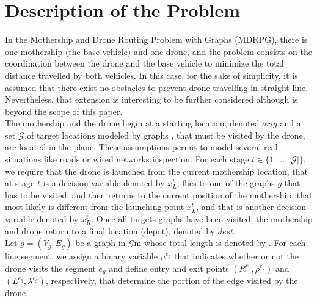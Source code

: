 \section{Description of the Problem}
\noindent
In the Mothership and Drone Routing Problem with Graphs (MDRPG), there is one mothership (the base vehicle) and one drone, and the problem consists on the coordination between the drone and the base vehicle to minimize the total distance travelled by both vehicles. In this case, for the sake of simplicity, it is assumed that there exist no obstacles to prevent drone travelling in straight line. Nevertheless, that extension is interesting to be further considered although is beyond the scope of this paper.\\
\noindent
The mothership and the drone begin at a starting location, denoted $orig$ and a set $\mathcal G$ of target locations modeled by graphs , that must be visited by the drone, are located in the plane. These assumptions permit to model several real situations like roads or wired networks inspection. 
For each stage $t \in \{1, \ldots, |\mathcal G|\}$, we require that the drone is launched from the current mothership location, that at stage $t$ is a decision variable denoted by $x_L^t$, flies to one of the graphs $g$ that has to be visited,  and then returns to the current position of the mothership, that most likely is different from the launching point $x_L^t$, and  that is another decision variable denoted by $x_R^t$. Once all targets graphs have been visited, the mothership and drone return to a final location (depot), denoted by $dest$.\\
\noindent
Let $g = (V_g, E_g)$ be a graph in $\mathcal G$m whose total length is denoted by  . For each line segment, we assign a binary variable $\mu^{e_g}$ that indicates whether or not the drone visits the segment $e_g$ and define entry and exit points $(R^{e_g}, \rho^{e_g})$ and $(L^{e_g}, \lambda^{e_g})$, respectively, that determine the portion of the edge visited by the drone. \\

